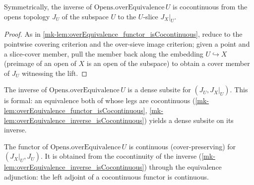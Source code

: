 \begin{lemma}\label{mk-lem:overEquivalence_inverse_isCocontinuous}
  \leanok

  Symmetrically, the inverse of \(\mathrm{Opens.overEquivalence}\,U\) is cocontinuous from the
  opens topology \(J_U\) of the subspace \(U\) to the \(U\)-slice \(J_X|_U\).
\end{lemma}
\begin{proof}
  As in \ref{mk-lem:overEquivalence_functor_isCocontinuous}, reduce to the pointwise covering
  criterion and the over-sieve image criterion; given a point and a slice-cover member, pull the
  member back along the embedding \(U \hookrightarrow X\) (preimage of an open of \(X\) is an open
  of the subspace) to obtain a cover member of \(J_U\) witnessing the lift.
\end{proof}

\begin{lemma}\label{mk-lem:overEquivalence_inverse_isDenseSubsite}
  \leanok

  The inverse of \(\mathrm{Opens.overEquivalence}\,U\) is a dense subsite for \((J_U, J_X|_U)\).
  This is formal: an equivalence both of whose legs are cocontinuous
  (\ref{mk-lem:overEquivalence_functor_isCocontinuous},
  \ref{mk-lem:overEquivalence_inverse_isCocontinuous}) yields a dense subsite on its inverse.
\end{lemma}

\begin{lemma}\label{mk-lem:overEquivalence_functor_isContinuous}
  \leanok

  The functor of \(\mathrm{Opens.overEquivalence}\,U\) is continuous (cover-preserving) for
  \((J_X|_U, J_U)\). It is obtained from the cocontinuity of the inverse
  (\ref{mk-lem:overEquivalence_inverse_isCocontinuous}) through the equivalence adjunction: the
  left adjoint of a cocontinuous functor is continuous.
\end{lemma}

